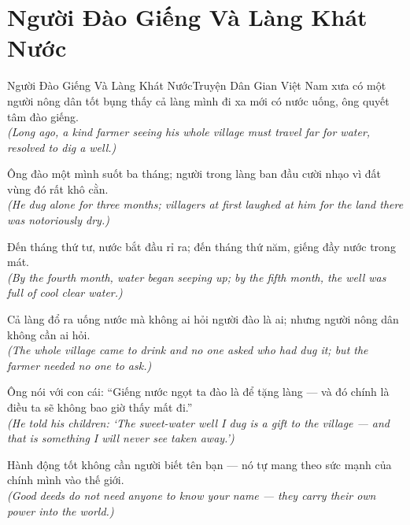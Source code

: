 \section{Người Đào Giếng Và Làng Khát Nước}
\begin{truyen}{Người Đào Giếng Và Làng Khát Nước}{Truyện Dân Gian Việt Nam}
 xưa có một người nông dân tốt bụng thấy cả làng mình đi xa mới có nước uống, ông quyết tâm đào giếng.\\[4pt]
\textit{(Long ago, a kind farmer seeing his whole village must travel far for water, resolved to dig a well.)}

Ông đào một mình suốt ba tháng; người trong làng ban đầu cười nhạo vì đất vùng đó rất khô cằn.\\[4pt]
\textit{(He dug alone for three months; villagers at first laughed at him for the land there was notoriously dry.)}

Đến tháng thứ tư, nước bắt đầu rỉ ra; đến tháng thứ năm, giếng đầy nước trong mát.\\[4pt]
\textit{(By the fourth month, water began seeping up; by the fifth month, the well was full of cool clear water.)}

Cả làng đổ ra uống nước mà không ai hỏi người đào là ai; nhưng người nông dân không cần ai hỏi.\\[4pt]
\textit{(The whole village came to drink and no one asked who had dug it; but the farmer needed no one to ask.)}

Ông nói với con cái: ``Giếng nước ngọt ta đào là để tặng làng --- và đó chính là điều ta sẽ không bao giờ thấy mất đi.''\\[4pt]
\textit{(He told his children: `The sweet-water well I dug is a gift to the village --- and that is something I will never see taken away.')}

\end{truyen}
\begin{baihoc}
  Hành động tốt không cần người biết tên bạn --- nó tự mang theo sức mạnh của chính mình vào thế giới.\\[4pt]
  \textit{(Good deeds do not need anyone to know your name --- they carry their own power into the world.)}
\end{baihoc}

